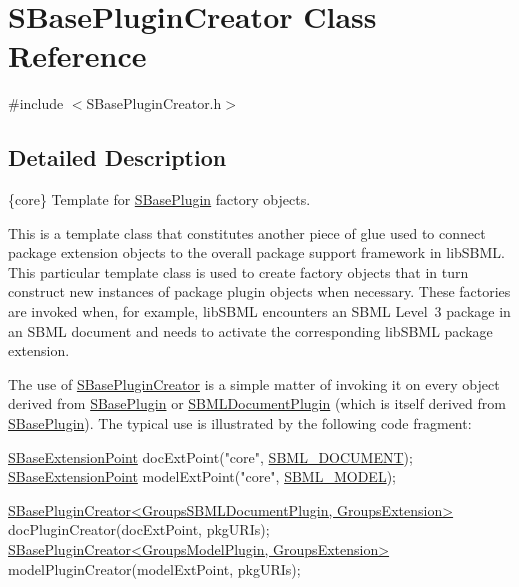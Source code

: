 \hypertarget{class_s_base_plugin_creator}{}\section{S\+Base\+Plugin\+Creator Class Reference}
\label{class_s_base_plugin_creator}


{\ttfamily \#include $<$S\+Base\+Plugin\+Creator.\+h$>$}



\subsection{Detailed Description}
\{core\} Template for \hyperlink{class_s_base_plugin}{S\+Base\+Plugin} factory objects.



\begin{DoxyParagraph}{}
This is a template class that constitutes another piece of glue used to connect package extension objects to the overall package support framework in lib\+S\+B\+ML. This particular template class is used to create factory objects that in turn construct new instances of package plugin objects when necessary. These factories are invoked when, for example, lib\+S\+B\+ML encounters an S\+B\+ML Level~3 package in an S\+B\+ML document and needs to activate the corresponding lib\+S\+B\+ML package extension.
\end{DoxyParagraph}
The use of \hyperlink{class_s_base_plugin_creator}{S\+Base\+Plugin\+Creator} is a simple matter of invoking it on every object derived from \hyperlink{class_s_base_plugin}{S\+Base\+Plugin} or \hyperlink{class_s_b_m_l_document_plugin}{S\+B\+M\+L\+Document\+Plugin} (which is itself derived from \hyperlink{class_s_base_plugin}{S\+Base\+Plugin}). The typical use is illustrated by the following code fragment\+:


\begin{DoxyCode}
\hyperlink{class_s_base_extension_point}{SBaseExtensionPoint} docExtPoint(\textcolor{stringliteral}{"core"}, \hyperlink{_s_b_m_l_type_codes_8h_aa283dddfd7671179362b2f38e2938cfeabfe976c674a5a708c1373dfdfa3bfa63}{SBML\_DOCUMENT});
\hyperlink{class_s_base_extension_point}{SBaseExtensionPoint} modelExtPoint(\textcolor{stringliteral}{"core"}, \hyperlink{_s_b_m_l_type_codes_8h_aa283dddfd7671179362b2f38e2938cfea3c866be107d7858b6dd1e978ed103028}{SBML\_MODEL});

\hyperlink{class_s_base_plugin_creator}{SBasePluginCreator<GroupsSBMLDocumentPlugin, GroupsExtension>}
       docPluginCreator(docExtPoint, pkgURIs);
\hyperlink{class_s_base_plugin_creator}{SBasePluginCreator<GroupsModelPlugin, GroupsExtension>}
       modelPluginCreator(modelExtPoint, pkgURIs);
\end{DoxyCode}


